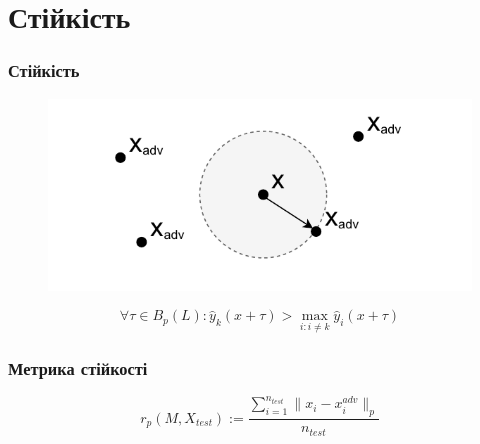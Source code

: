 \documentclass{beamer}
\numberwithin{equation}{section}
\begin{document}
	\section{Стійкість}
	\begin{frame}
		\frametitle{Стійкість}
		
		\begin{figure}[h]
			\centering
			\includegraphics[width=0. 8\textwidth]{../images/2Dball.pdf}
			
		\end{figure}
		\begin{equation}
			\forall \tau \in B_{p}(L): \hat{y}_{k}(x+\tau)>\max _{i: i \neq k} \hat{y}_{i}(x+\tau)
		\end{equation}
		
	\end{frame}
	\begin{frame}
		\frametitle{Метрика стійкості}
		\begin{equation}
			\label{robustness-metric}
			r_p(M, X_{test}) := \frac{\sum\limits^{n_{test}}_{i = 1}\|x_i-x^{adv}_i\|_{p}}{n_{test}}
		\end{equation}
	\end{frame}
\end{document}
